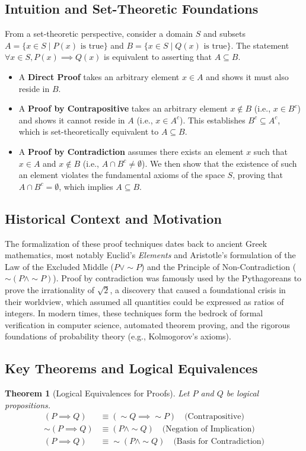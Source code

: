 \documentclass[11pt, a4paper]{article}
\newtheorem{theorem}{Theorem}[section]
\theoremstyle{definition}
\theoremstyle{remark}
\begin{document}
\subsection{Intuition and Set-Theoretic Foundations}
From a set-theoretic perspective, consider a domain $S$ and subsets $A = \{x \in S \mid P(x) \text{ is true}\}$ and $B = \{x \in S \mid Q(x) \text{ is true}\}$. The statement $\forall x \in S, P(x) \implies Q(x)$ is equivalent to asserting that $A \subseteq B$. 
\begin{itemize}
    \item A \textbf{Direct Proof} takes an arbitrary element $x \in A$ and shows it must also reside in $B$.
    \item A \textbf{Proof by Contrapositive} takes an arbitrary element $x \notin B$ (i.e., $x \in B^c$) and shows it cannot reside in $A$ (i.e., $x \in A^c$). This establishes $B^c \subseteq A^c$, which is set-theoretically equivalent to $A \subseteq B$.
    \item A \textbf{Proof by Contradiction} assumes there exists an element $x$ such that $x \in A$ and $x \notin B$ (i.e., $A \cap B^c \neq \emptyset$). We then show that the existence of such an element violates the fundamental axioms of the space $S$, proving that $A \cap B^c = \emptyset$, which implies $A \subseteq B$.
\end{itemize}

\subsection{Historical Context and Motivation}
The formalization of these proof techniques dates back to ancient Greek mathematics, most notably Euclid's \textit{Elements} and Aristotle's formulation of the Law of the Excluded Middle ($P \lor \sim P$) and the Principle of Non-Contradiction ($\sim(P \land \sim P)$). Proof by contradiction was famously used by the Pythagoreans to prove the irrationality of $\sqrt{2}$, a discovery that caused a foundational crisis in their worldview, which assumed all quantities could be expressed as ratios of integers. In modern times, these techniques form the bedrock of formal verification in computer science, automated theorem proving, and the rigorous foundations of probability theory (e.g., Kolmogorov's axioms).

\subsection{Key Theorems and Logical Equivalences}
\begin{theorem}[Logical Equivalences for Proofs]
Let $P$ and $Q$ be logical propositions.
\begin{align}
    (P \implies Q) &\equiv (\sim Q \implies \sim P) \quad \text{(Contrapositive)} \\
    \sim(P \implies Q) &\equiv (P \land \sim Q) \quad \text{(Negation of Implication)} \\
    (P \implies Q) &\equiv \sim(P \land \sim Q) \quad \text{(Basis for Contradiction)}
\end{align}
\end{theorem}
\end{document}
